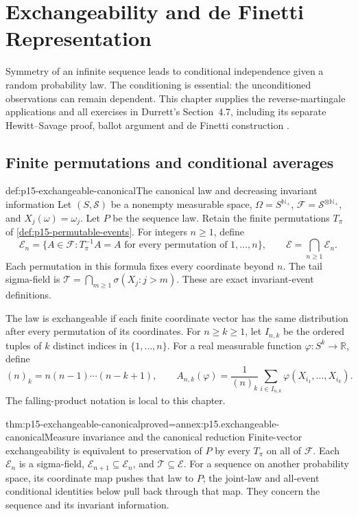 \chapter{Exchangeability and de Finetti Representation}
\label{sec:p15-exchangeability-and-definetti}

Symmetry of an infinite sequence leads to conditional independence
given a random probability law. The conditioning is essential: the
unconditioned observations can remain dependent. This chapter supplies
the reverse-martingale applications and all exercises in Durrett's
Section~4.7, including its separate Hewitt--Savage proof, ballot
argument and de Finetti construction
\cite[pp.~249--255]{DurrettPTEAuthor2019}.

\section{Finite permutations and conditional averages}

\begin{hbdefinition}{def:p15-exchangeable-canonical}{The canonical law and decreasing invariant information}
Let \((S,\mathcal S)\) be a nonempty measurable space,
\(\Omega=S^{\mathbb N_+}\), \(\mathcal F=\mathcal S^{\otimes\mathbb N_+}\),
and \(X_j(\omega)=\omega_j\). Let \(P\) be the sequence law.
Retain the finite permutations \(T_\pi\) of
\cref{def:p15-permutable-events}. For integers \(n\geq1\), define
\[
 \mathcal E_n=\{A\in\mathcal F:
       T_\pi^{-1}A=A\text{ for every permutation of }1,\ldots,n\},
 \qquad \mathcal E=\bigcap_{n\geq1}\mathcal E_n.
\]
Each permutation in this formula fixes every coordinate beyond \(n\).
The tail sigma-field is
\(\mathcal T=\bigcap_{m\geq1}\sigma(X_j:j>m)\).
These are exact invariant-event definitions.

The law is exchangeable if each finite coordinate vector has the same
distribution after every permutation of its coordinates.
For \(n\geq k\geq1\), let \(I_{n,k}\) be the ordered tuples of
\(k\) distinct indices in \(\{1,\ldots,n\}\).
For a real measurable function \(\varphi:S^k\to\mathbb R\), define
\[
 (n)_k=n(n-1)\cdots(n-k+1),\qquad
 A_{n,k}(\varphi)=\frac1{(n)_k}
       \sum_{i\in I_{n,k}}\varphi(X_{i_1},\ldots,X_{i_k}).
\]
The falling-product notation is local to this chapter.
\end{hbdefinition}

\begin{hblemma}{thm:p15-exchangeable-canonical}{proved=annex:p15.exchangeable-canonical}{Measure invariance and the canonical reduction}
Finite-vector exchangeability is equivalent to preservation of \(P\)
by every \(T_\pi\) on all of \(\mathcal F\).
Each \(\mathcal E_n\) is a sigma-field,
\(\mathcal E_{n+1}\subseteq\mathcal E_n\), and
\(\mathcal T\subseteq\mathcal E\).
For a sequence on another probability space, its coordinate map
pushes that law to \(P\); the joint-law and all-event conditional
identities below pull back through that map. They concern the sequence
and its invariant information.
\end{hblemma}

